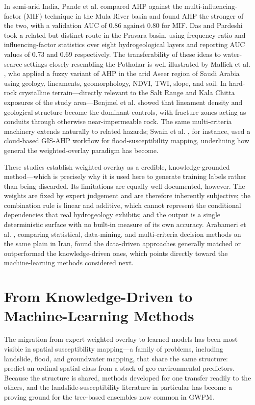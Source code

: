 In semi-arid India, Pande et al. \cite{pande2021ahpmif} compared AHP against the
multi-influencing-factor (MIF) technique in the Mula River basin and found AHP
the stronger of the two, with a validation AUC of 0.86 against 0.80 for MIF. Das
and Pardeshi \cite{das2018pravara} took a related but distinct route in the
Pravara basin, using frequency-ratio and influencing-factor statistics over eight
hydrogeological layers and reporting AUC values of 0.73 and 0.69 respectively.
The transferability of these ideas to water-scarce settings closely resembling
the Pothohar is well illustrated by Mallick et al. \cite{mallick2019fuzzyahp},
who applied a fuzzy variant of AHP in the arid Aseer region of Saudi Arabia using
geology, lineaments, geomorphology, NDVI, TWI, slope, and soil. In hard-rock
crystalline terrain---directly relevant to the Salt Range and Kala Chitta
exposures of the study area---Benjmel et al. \cite{benjmel2020morocco} showed
that lineament density and geological structure become the dominant controls,
with fracture zones acting as conduits through otherwise near-impermeable rock.
The same multi-criteria machinery extends naturally to related hazards; Swain et
al. \cite{swain2020floodahp}, for instance, used a cloud-based GIS-AHP workflow
for flood-susceptibility mapping, underlining how general the weighted-overlay
paradigm has become.

These studies establish weighted overlay as a credible, knowledge-grounded
method---which is precisely why it is used here to generate training labels
rather than being discarded. Its limitations are equally well documented,
however. The weights are fixed by expert judgement and are therefore inherently
subjective; the combination rule is linear and additive, which cannot represent
the conditional dependencies that real hydrogeology exhibits; and the output is a
single deterministic surface with no built-in measure of its own accuracy.
Arabameri et al. \cite{arabameri2018shahroud}, comparing statistical,
data-mining, and multi-criteria decision methods on the same plain in Iran, found
the data-driven approaches generally matched or outperformed the knowledge-driven
ones, which points directly toward the machine-learning methods considered next.

\section{From Knowledge-Driven to Machine-Learning Methods}
\label{sec:lit_ml_spatial}

The migration from expert-weighted overlay to learned models has been most
visible in spatial susceptibility mapping---a family of problems, including
landslide, flood, and groundwater mapping, that share the same structure:
predict an ordinal spatial class from a stack of geo-environmental predictors.
Because the structure is shared, methods developed for one transfer readily to
the others, and the landslide-susceptibility literature in particular has become
a proving ground for the tree-based ensembles now common in GWPM.

